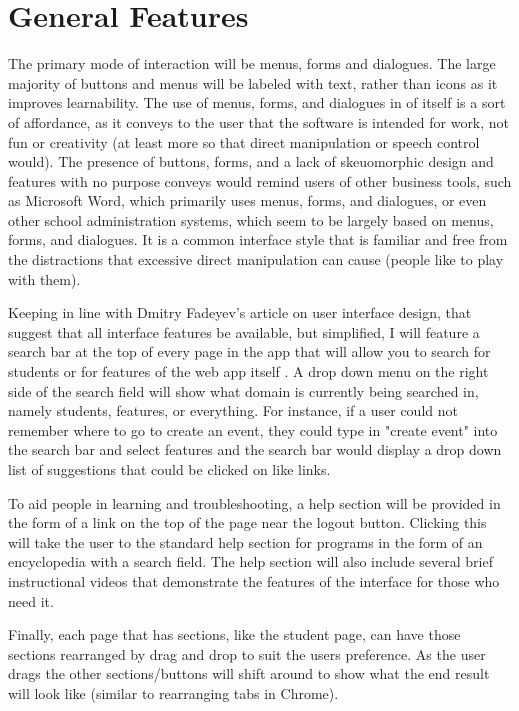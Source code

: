 \documentclass{article}
\begin{document}
\section{General Features}

The primary mode of interaction will be menus, forms and dialogues. The large majority of buttons and menus will be labeled with text, rather than icons as it improves learnability. The use of menus, forms, and dialogues in of itself is a sort of affordance, as it conveys to the user that the software is intended for work, not fun or creativity (at least more so that direct manipulation or speech control would). The presence of buttons, forms, and a lack of skeuomorphic design and features with no purpose conveys would remind users of other business tools, such as Microsoft Word, which primarily uses menus, forms, and dialogues, or even other school administration systems, which seem to be largely based on menus, forms, and dialogues. It is a common interface style that is familiar and free from the distractions that excessive direct manipulation can cause (people like to play with them).

Keeping in line with Dmitry Fadeyev's article on user interface design, that suggest that all interface features be available, but simplified, I will feature a search bar at the top of every page in the app that will allow you to search for students or for features of the web app itself \cite{techniques}. A drop down menu on the right side of the search field will show what domain is currently being searched in, namely students, features, or everything. For instance, if a user could not remember where to go to create an event, they could type in "create event" into the search bar and select features and the search bar would display a drop down list of suggestions that could be clicked on like links. 

To aid people in learning and troubleshooting, a help section will be provided in the form of a link on the top of the page near the logout button. Clicking this will take the user to the standard help section for programs in the form of an encyclopedia with a search field. The help section will also include several brief instructional videos that demonstrate the features of the interface for those who need it.

Finally, each page that has sections, like the student page, can have those sections rearranged by drag and drop to suit the users preference. As the user drags the other sections/buttons will shift around to show what the end result will look like (similar to rearranging tabs in Chrome).
\end{document}
